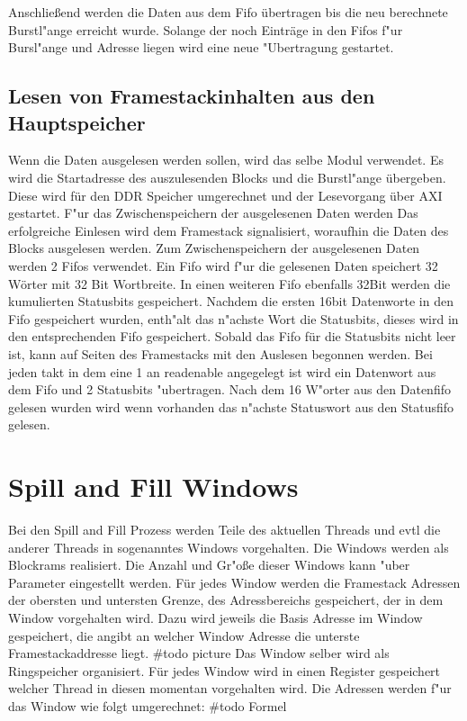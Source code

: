 Anschlie{\ss}end werden die Daten aus dem Fifo \"ubertragen bis die neu berechnete Burstl"ange erreicht wurde. Solange der noch Eintr\"age in den Fifos f"ur Bursl"ange und Adresse liegen wird eine neue "Ubertragung gestartet. 


\subsection{Lesen von Framestackinhalten aus den Hauptspeicher}
Wenn die Daten ausgelesen werden sollen, wird das selbe Modul verwendet. Es wird die Startadresse des auszulesenden Blocks und die Burstl"ange \"ubergeben. Diese wird f\"ur den DDR Speicher umgerechnet und der Lesevorgang \"uber AXI gestartet. F"ur das Zwischenspeichern der ausgelesenen Daten werden  Das erfolgreiche Einlesen wird dem Framestack signalisiert, woraufhin die Daten des Blocks ausgelesen werden. Zum Zwischenspeichern der ausgelesenen Daten werden 2 Fifos verwendet. Ein Fifo wird f"ur die gelesenen Daten speichert 32 Wörter mit 32 Bit Wortbreite. In einen weiteren Fifo ebenfalls 32Bit werden die kumulierten Statusbits gespeichert. Nachdem die ersten 16bit Datenworte in den Fifo gespeichert wurden, enth"alt das n"achste Wort die Statusbits, dieses wird in den entsprechenden Fifo gespeichert. Sobald das Fifo für die Statusbits nicht leer ist, kann auf Seiten des Framestacks mit den Auslesen begonnen werden. Bei jeden takt in dem eine 1 an readenable angegelegt ist wird ein Datenwort aus dem Fifo und 2 Statusbits "ubertragen. Nach dem 16 W"orter aus den Datenfifo gelesen wurden wird wenn vorhanden das n"achste Statuswort aus den Statusfifo gelesen. 

\section{Spill and Fill Windows}

Bei den Spill and Fill Prozess werden Teile des aktuellen Threads  und evtl die anderer Threads in sogenanntes Windows vorgehalten. Die Windows werden als Blockrams realisiert. 
Die Anzahl und Gr"oße dieser Windows kann "uber Parameter eingestellt werden. Für jedes Window werden die Framestack Adressen der obersten und untersten Grenze, des Adressbereichs gespeichert, der in dem Window vorgehalten wird. Dazu wird jeweils die Basis Adresse im Window gespeichert, die angibt an welcher Window Adresse die unterste Framestackaddresse liegt. 
#todo picture
Das Window selber wird als Ringspeicher organisiert. Für jedes Window wird in einen Register gespeichert welcher Thread in diesen momentan vorgehalten wird. 
Die Adressen werden f"ur das Window wie folgt umgerechnet:
#todo Formel 

